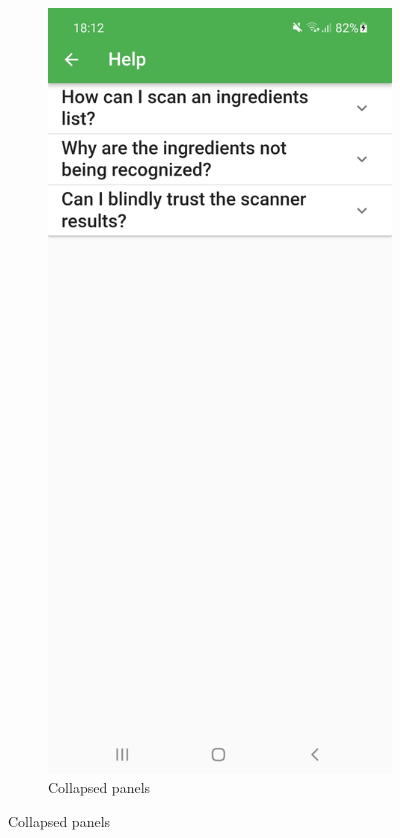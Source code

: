 \begin{figure}[h]
    \begin{subfigure}{0.5\textwidth}
        \centering
        \includegraphics[width=0.9\linewidth]{Figures/Screenshot/help_collapse.jpg} 
        \caption{Collapsed panels}

\end{subfigure}
\end{figure}
